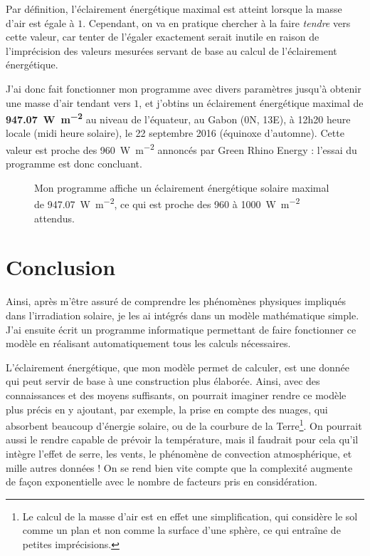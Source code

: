 \documentclass[12pt]{article}
\begin{document}
Par définition, l'éclairement énergétique maximal est atteint lorsque la masse d'air est égale à $1$.
Cependant, on va en pratique chercher à la faire \emph{tendre} vers cette valeur, car tenter de l'égaler exactement serait inutile en raison de l'imprécision des valeurs mesurées servant de base au calcul de l'éclairement énergétique.

J'ai donc fait fonctionner mon programme avec divers paramètres jusqu'à obtenir une masse d'air tendant vers $1$, et j'obtins un éclairement énergétique maximal de \textbf{\SI{947.07}{\watt\per\square\meter}} au niveau de l'équateur, au Gabon (0\degree N, 13\degree E), à 12h20 heure locale (midi heure solaire), le 22 septembre 2016 (équinoxe d'automne).
Cette valeur est proche des \SI{960}{\watt\per\square\meter} annoncés par Green Rhino Energy : l'essai du programme est donc concluant.

\begin{figure}[!ht]
  \centering
  \caption{Mon programme affiche un éclairement énergétique solaire maximal de \SI{947.07}{\watt\per\square\meter}, ce qui est proche des 960 à \SI{1000}{\watt\per\square\meter} attendus.}
  \label{fig:maximum}
\end{figure}


\FloatBarrier
\section{Conclusion}

Ainsi, après m'être assuré de comprendre les phénomènes physiques impliqués dans l'irradiation solaire, je les ai intégrés dans un modèle mathématique simple. J'ai ensuite écrit un programme informatique permettant de faire fonctionner ce modèle en réalisant automatiquement tous les calculs nécessaires.

L'éclairement énergétique, que mon modèle permet de calculer, est une donnée qui peut servir de base à une construction plus élaborée.
Ainsi, avec des connaissances et des moyens suffisants, on pourrait imaginer rendre ce modèle plus précis en y ajoutant, par exemple, la prise en compte des nuages, qui absorbent beaucoup d'énergie solaire, ou de la courbure de la Terre\footnote{Le calcul de la masse d'air est en effet une simplification, qui considère le sol comme un plan et non comme la surface d'une sphère, ce qui entraîne de petites imprécisions.}.
On pourrait aussi le rendre capable de prévoir la température, mais il faudrait pour cela qu'il intègre l'effet de serre, les vents, le phénomène de convection atmosphérique, et mille autres données !
On se rend bien vite compte que la complexité augmente de façon exponentielle avec le nombre de facteurs pris en considération.
\end{document}
